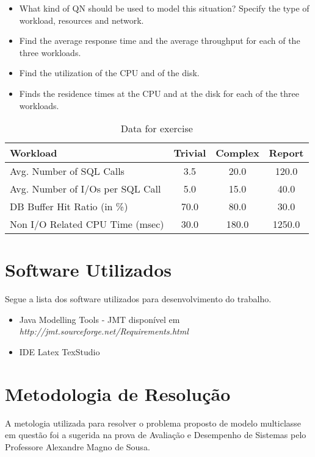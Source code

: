 \documentclass[11pt,a4paper]{abntex2}
\begin{document}
	\begin{itemize}
		\item What kind of QN should be used to model this situation? Specify the type of workload, resources and network.
		\item Find the average response time and the average throughput for each of the three workloads.
		\item Find the utilization of the CPU and of the disk.
		\item Finds the residence times at the CPU and at the disk for each of the three workloads.
		
	\end{itemize}
	
	\begin{table}[htbp]
		\centering
		\caption{Data for exercise} 
		
		\begin{tabular}{lccc}
			\toprule
		 Workload    & Trivial    &Complex    & Report\\
			\midrule
		Avg. Number of SQL Calls         & 3.5  & 20.0  & 120.0    \\
		Avg. Number of I/Os per SQL Call & 5.0  & 15.0 & 40.0   \\
		DB Buffer Hit Ratio (in \%)      & 70.0 & 80.0   & 30.0     \\
		Non I/O Related CPU Time (msec)	 & 30.0 & 180.0   & 1250.0    \\
			\bottomrule
		\end{tabular}%
		\label{tab:addlabel}%
	\end{table}%
	
\newpage

\section*{\textbf{Software Utilizados}}
	Segue a lista dos software utilizados para desenvolvimento do trabalho.
	
	\begin{itemize}
	\item  Java Modelling Tools - JMT disponível em \textit{http://jmt.sourceforge.net/Requirements.html}
	\item IDE Latex TexStudio
	\end{itemize}



\section*{\textbf{Metodologia de Resolução}}
	A metologia utilizada para resolver o problema proposto de modelo multiclasse em questão foi a sugerida na prova de Avaliação e Desempenho de Sistemas pelo Professore Alexandre Magno de Sousa. 
\end{document}
